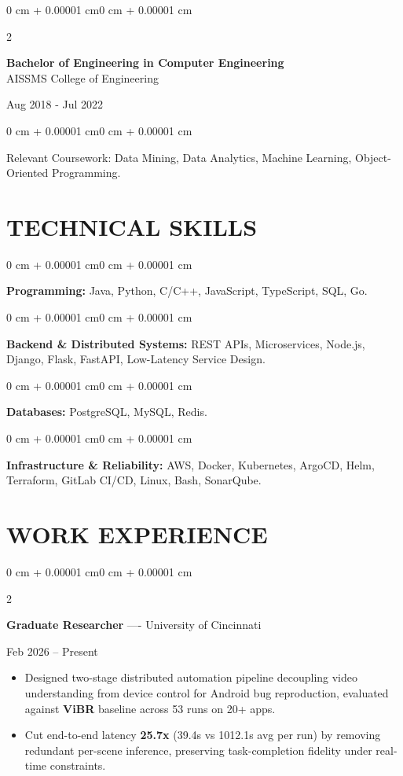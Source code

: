 \documentclass[10pt, letterpaper]{article}
\newenvironment{highlights}{
    \begin{itemize}[
        topsep=0.10 cm,
        parsep=0.06 cm,
        partopsep=0pt,
        itemsep=0.06 cm,
        leftmargin=12pt
    ]
}{
    \end{itemize}
}
\newenvironment{onecolentry}{
    \begin{adjustwidth}{0 cm + 0.00001 cm}{0 cm + 0.00001 cm}
}{
    \end{adjustwidth}
}
\newenvironment{twocolentry}[2][]{
    \onecolentry
    \def\secondColumn{#2}
    \setcolumnwidth{\fill, 4.5 cm}
    \begin{paracol}{2}
}{
    \switchcolumn \raggedleft \secondColumn
    \end{paracol}
    \endonecolentry
}
\begin{document}
\begin{twocolentry}{
    Aug 2018 - Jul 2022
}
    \textbf{Bachelor of Engineering in Computer Engineering} \\
    AISSMS College of Engineering
\end{twocolentry}
\begin{onecolentry}
Relevant Coursework: Data Mining, Data Analytics, Machine Learning, Object-Oriented Programming.
\end{onecolentry}
\section{TECHNICAL SKILLS}
\begin{onecolentry}
\textbf{Programming:} Java, Python, C/C++, JavaScript, TypeScript, SQL, Go.
\end{onecolentry}
\vspace{0.06 cm}
\begin{onecolentry}
\textbf{Backend \& Distributed Systems:} REST APIs, Microservices, Node.js, Django, Flask, FastAPI, Low-Latency Service Design.
\end{onecolentry}
\vspace{0.06 cm}
\begin{onecolentry}
\textbf{Databases:} PostgreSQL, MySQL, Redis.
\end{onecolentry}
\vspace{0.06 cm}
\begin{onecolentry}
\textbf{Infrastructure \& Reliability:} AWS, Docker, Kubernetes, ArgoCD, Helm, Terraform, GitLab CI/CD, Linux, Bash, SonarQube.
\end{onecolentry}

\section{WORK EXPERIENCE}
\begin{twocolentry}{Feb 2026 -- Present}
\textbf{Graduate Researcher} ---- University of Cincinnati
\end{twocolentry}
\begin{highlights}
  \item Designed two-stage distributed automation pipeline decoupling video understanding from device control for Android bug reproduction, evaluated against \textbf{ViBR} baseline across 53 runs on 20+ apps.
  \item Cut end-to-end latency \textbf{25.7x} (39.4s vs 1012.1s avg per run) by removing redundant per-scene inference, preserving task-completion fidelity under real-time constraints.
\end{highlights}
\end{document}
